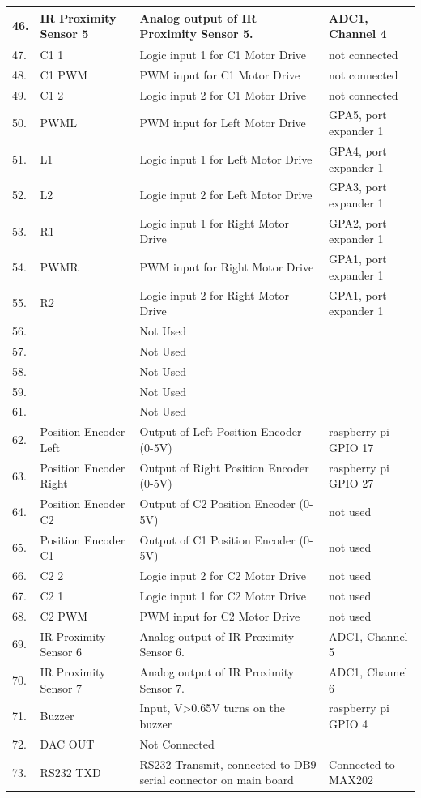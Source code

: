 \documentclass[a4paper,12pt,oneside]{book}
\begin{document}
\begin{tabular}{|p{2cm}|p{3cm}|p{6cm}|p{5cm}|}
	\hline
46. &IR Proximity Sensor 5 &Analog output of IR Proximity Sensor 5.& ADC1, Channel 4  \\
\hline
47. & C1 1 & Logic input 1 for C1 Motor Drive& not connected\\
\hline
48. & C1 PWM & PWM input for C1 Motor Drive& not connected\\
\hline
49. & C1 2 & Logic input 2 for C1 Motor Drive& not connected\\
\hline
50. & PWML & PWM input for Left Motor Drive&GPA5, port expander 1\\
\hline
51. & L1 & Logic input 1 for Left Motor Drive& GPA4, port expander 1\\
\hline
52. & L2 & Logic input 2 for Left Motor Drive &GPA3, port expander 1\\
\hline
53. & R1 & Logic input 1 for Right Motor Drive&GPA2, port expander 1\\
\hline
54. & PWMR & PWM input for Right Motor Drive&GPA1, port expander 1\\
\hline
55. & R2 & Logic input 2 for Right Motor Drive&GPA1, port expander 1\\
\hline
56. & & Not Used&\\
\hline
57. & & Not Used&\\
\hline
58. & & Not Used&\\
\hline
59. & & Not Used&\\
\hline
61. & & Not Used&\\
\hline
62. &Position Encoder Left &Output of Left Position Encoder (0-5V)&raspberry pi GPIO 17\\
\hline
63. &Position Encoder Right &Output of Right Position Encoder (0-5V)&raspberry pi GPIO 27\\
\hline
64. &Position Encoder C2 &Output of C2 Position Encoder (0-5V)&not used\\
\hline
65. &Position Encoder C1 &Output of C1 Position Encoder (0-5V)&not used\\
\hline
66. & C2 2 & Logic input 2 for C2 Motor Drive&not used\\
\hline
67. & C2 1 & Logic input 1 for C2 Motor Drive&not used\\
\hline
68. & C2 PWM & PWM input for C2 Motor Drive&not used\\
\hline
69. &IR Proximity Sensor 6 &Analog output of IR Proximity Sensor 6.&ADC1, Channel 5 \\
\hline
70. &IR Proximity Sensor 7 &Analog output of IR Proximity Sensor 7.&ADC1, Channel 6 \\
\hline
71. &Buzzer &Input, V>0.65V turns on the buzzer &raspberry pi GPIO 4\\
\hline
72. &DAC OUT &Not Connected& \\
\hline
73. &RS232 TXD & RS232 Transmit, connected to DB9 serial connector on main board & Connected to MAX202 \\
\hline


 
\end{tabular}
\pagebreak 
\end{document}
